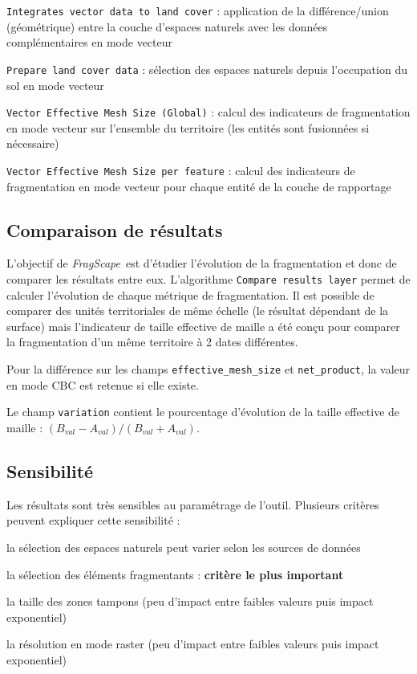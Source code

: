 \documentclass[11pt]{article}
\newcommand{\tool}{\emph{FragScape}}
\let\tempone\itemize
\let\temptwo\enditemize
\renewenvironment{itemize}{\tempone\addtolength{\itemsep}{-0.5\baselineskip}}{\temptwo}
\renewenvironment{enumerate}{\tempone\addtolength{\itemsep}{-0.5\baselineskip}}{\temptwo}
\begin{document}
\begin{enumerate}
    \item \texttt{Integrates vector data to land cover} : application de la différence/union (géométrique) entre la couche d'espaces naturels avec les données complémentaires en mode vecteur
    \item \texttt{Prepare land cover data} : sélection des espaces naturels depuis l'occupation du sol en mode vecteur
    \item \texttt{Vector Effective Mesh Size (Global)} :  calcul des indicateurs de fragmentation en mode vecteur sur l'ensemble du territoire (les entités sont fusionnées si nécessaire)
    \item \texttt{Vector Effective Mesh Size per feature} :  calcul des indicateurs de fragmentation en mode vecteur pour chaque entité de la couche de rapportage
\end{enumerate}


\subsection{Comparaison de résultats}

L'objectif de \tool\ est d'étudier l'évolution de la fragmentation et donc de comparer les résultats entre eux. L'algorithme \texttt{Compare results layer} permet de calculer l'évolution de chaque métrique de fragmentation. Il est possible de comparer des unités territoriales de même échelle (le résultat dépendant de la surface) mais l'indicateur de taille effective de maille a été conçu pour comparer la fragmentation d'un même territoire à 2 dates différentes.

Pour la différence sur les champs \texttt{effective\_mesh\_size} et \texttt{net\_product}, la valeur en mode CBC est retenue si elle existe.

Le champ \texttt{variation} contient le pourcentage d'évolution de la taille effective de maille : $(B_{val} - A_{val} ) / (B_{val} + A_{val})$.

\subsection{Sensibilité}
\label{sec:cmp}

Les résultats sont très sensibles au paramétrage de l'outil. Plusieurs critères peuvent expliquer cette sensibilité :
\begin{itemize}
    \item la sélection des espaces naturels peut varier selon les sources de données
    \item la sélection des éléments fragmentants : \textbf{critère le plus important}
    \item la taille des zones tampons (peu d'impact entre faibles valeurs puis impact exponentiel)
    \item la résolution en mode raster (peu d'impact entre faibles valeurs puis impact exponentiel)
\end{itemize}
\end{document}
